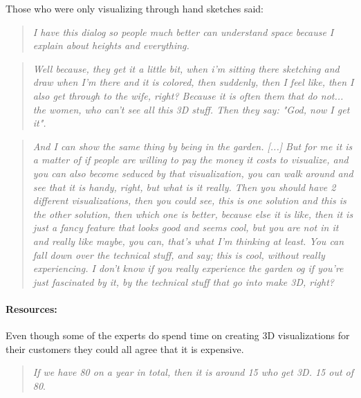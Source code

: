 		Those who were only visualizing through hand sketches said:\\	
		\begin{quote}
			\textit{I have this dialog so people much better can understand space because I explain about heights and everything.}\label{quote:expertRoom3}\\
		\end{quote}
	
		\begin{quote}
			\textit{Well because, they get it a little bit, when i'm sitting there sketching and draw when I'm there and it is colored, then suddenly, then I feel like, then I also get through to the wife, right? Because it is often them that do not... the women, who can't see all this 3D stuff. Then they say: "God, now I get it".}\label{quote:expertRoom4}\\
		\end{quote}
	
		\begin{quote}
			\textit{And I can show the same thing by being in the garden. [...] But for me it is a matter of if people are willing to pay the money it costs to visualize, and you can also become seduced by that visualization, you can walk around and see that it is handy, right, but what is it really. Then you should have 2 different visualizations, then you could see, this is one solution and this is the other solution, then which one is better, because else it is like, then it is just a fancy feature that looks good and seems cool, but you are not in it and really like maybe, you can, that's what I'm thinking at least. You can fall down over the technical stuff, and say; this is cool, without really experiencing. I don't know if you really experience the garden og if you're just fascinated by it, by the technical stuff that go into make 3D, right?}\label{quote:expertRoom5}\\
		\end{quote}
		
		\paragraph*{Resources:}
		Even though some of the experts do spend time on creating 3D visualizations for their customers they could all agree that it is expensive.\\
		
		\begin{quote}
			\textit{If we have 80 on a year in total, then it is around 15 who get 3D. 15 out of 80}\label{quote:expertRessources1}.\\
		\end{quote}
		
